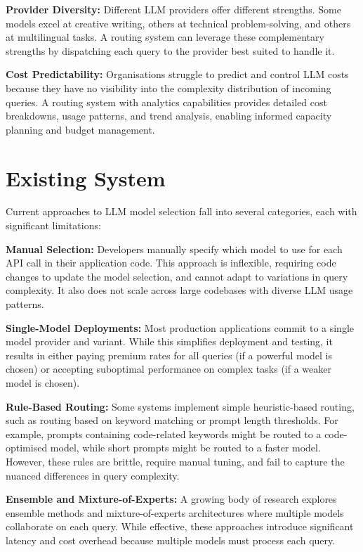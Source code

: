 \documentclass[oneside,12pt,a4paper]{report}
\begin{document}
\textbf{Provider Diversity:} Different LLM providers offer different strengths. Some models excel at creative writing, others at technical problem-solving, and others at multilingual tasks. A routing system can leverage these complementary strengths by dispatching each query to the provider best suited to handle it.

\textbf{Cost Predictability:} Organisations struggle to predict and control LLM costs because they have no visibility into the complexity distribution of incoming queries. A routing system with analytics capabilities provides detailed cost breakdowns, usage patterns, and trend analysis, enabling informed capacity planning and budget management.

\section{Existing System}

Current approaches to LLM model selection fall into several categories, each with significant limitations:

\textbf{Manual Selection:} Developers manually specify which model to use for each API call in their application code. This approach is inflexible, requiring code changes to update the model selection, and cannot adapt to variations in query complexity. It also does not scale across large codebases with diverse LLM usage patterns.

\textbf{Single-Model Deployments:} Most production applications commit to a single model provider and variant. While this simplifies deployment and testing, it results in either paying premium rates for all queries (if a powerful model is chosen) or accepting suboptimal performance on complex tasks (if a weaker model is chosen).

\textbf{Rule-Based Routing:} Some systems implement simple heuristic-based routing, such as routing based on keyword matching or prompt length thresholds. For example, prompts containing code-related keywords might be routed to a code-optimised model, while short prompts might be routed to a faster model. However, these rules are brittle, require manual tuning, and fail to capture the nuanced differences in query complexity.

\textbf{Ensemble and Mixture-of-Experts:} A growing body of research explores ensemble methods and mixture-of-experts architectures where multiple models collaborate on each query. While effective, these approaches introduce significant latency and cost overhead because multiple models must process each query.
\end{document}
